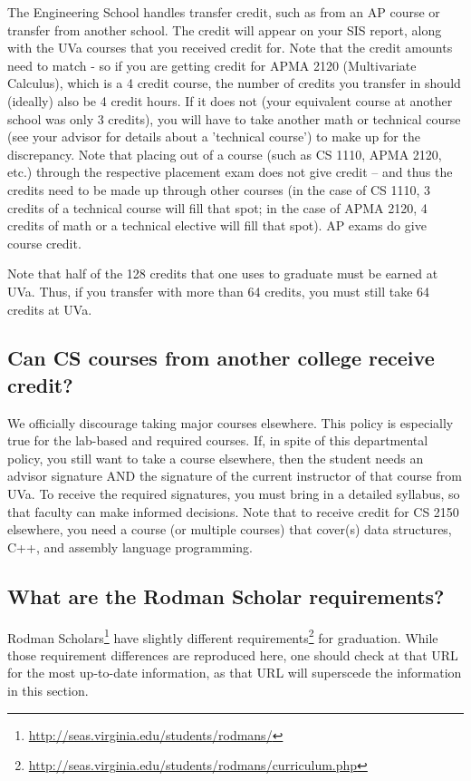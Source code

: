 \documentclass[10pt,letter]{book}
\newcommand{\myurl}[1]{\footnote{\scriptsize\url{#1}}}
\begin{document}
The Engineering School handles transfer credit, such as from an AP
course or transfer from another school. The credit will appear on your
SIS report, along with the UVa courses that you received credit
for. Note that the credit amounts need to match - so if you are
getting credit for APMA 2120 (Multivariate Calculus), which is a
4 credit course, the number of credits you transfer in should
(ideally) also be 4 credit hours. If it does not (your equivalent
course at another school was only 3 credits), you will have to take
another math or technical course (see your advisor for details about a
'technical course') to make up for the discrepancy. Note that placing
out of a course (such as CS 1110, APMA 2120, etc.) through
the respective placement exam does not give credit – and thus the
credits need to be made up through other courses (in the case of CS
1110, 3 credits of a technical course will fill that spot; in
the case of APMA 2120, 4 credits of math or a technical elective
will fill that spot). AP exams do give course credit.

Note that half of the 128 credits that one uses to graduate must be
earned at UVa. Thus, if you transfer with more than 64 credits, you
must still take 64 credits at UVa.

\subsection{Can CS courses from another college receive credit?}

We officially discourage taking major courses elsewhere. This policy
is especially true for the lab-based and required courses. If, in
spite of this departmental policy, you still want to take a course
elsewhere, then the student needs an advisor signature AND the
signature of the current instructor of that course from UVa. To
receive the required signatures, you must bring in a detailed
syllabus, so that faculty can make informed decisions. Note that to
receive credit for CS 2150 elsewhere, you need a course (or
multiple courses) that cover(s) data structures, C++, and assembly
language programming.

\subsection{What are the Rodman Scholar requirements?}

Rodman Scholars\myurl{http://seas.virginia.edu/students/rodmans/} have
slightly different
requirements\myurl{http://seas.virginia.edu/students/rodmans/curriculum.php}
for graduation.  While those requirement differences are reproduced
here, one should check at that URL for the most up-to-date
information, as that URL will superscede the information in this
section.
\end{document}
